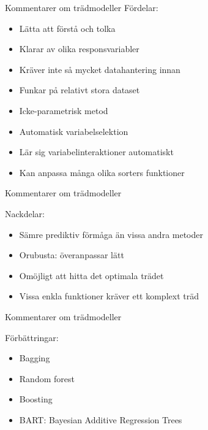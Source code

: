 \documentclass[10pt,english]{beamer}
\begin{document}
\begin{frame}{Kommentarer om trädmodeller}
    Fördelar:
    \begin{itemize}
        \item Lätta att förstå och tolka
        \item Klarar av olika responsvariabler
        \item Kräver inte så mycket datahantering innan
        \item Funkar på relativt stora dataset
        \item Icke-parametrisk metod
        \item Automatisk variabelselektion
        \item Lär sig variabelinteraktioner automatiskt
        \item Kan anpassa många olika sorters funktioner
    \end{itemize}

\end{frame}


\begin{frame}{Kommentarer om trädmodeller}

    Nackdelar:
    \begin{itemize}
        \item Sämre prediktiv förmåga än vissa andra metoder
        \item Orubusta: överanpassar lätt
        \item Omöjligt att hitta det optimala trädet
        \item Vissa enkla funktioner kräver ett komplext träd
    \end{itemize}
\end{frame}



\begin{frame}{Kommentarer om trädmodeller}

    Förbättringar:
    \begin{itemize}
        \item Bagging
        \item Random forest
        \item Boosting
        \item BART: Bayesian Additive Regression Trees
    \end{itemize}
    
\end{frame}
\end{document}

